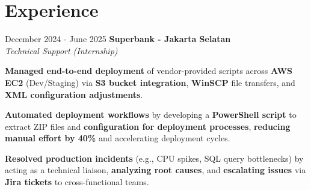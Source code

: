 \documentclass[../main.tex]{subfiles}
\begin{document}
\section{Experience}

\begin{twocolentry}{December 2024 - June 2025}
    \textbf{Superbank \color{Gray}- Jakarta Selatan}\\
    \textit{Technical Support (Internship)}
\end{twocolentry}

\vspace{0.10 cm}
\begin{onecolentry}
\begin{highlights}
    \item \textbf{Managed end-to-end deployment} of vendor-provided scripts across \textbf{AWS EC2} (Dev/Staging) via \textbf{S3 bucket integration}, \textbf{WinSCP} file transfers, and \textbf{XML configuration adjustments}.
    \item \textbf{Automated deployment workflows} by developing a \textbf{PowerShell script} to extract ZIP files and \textbf{configuration for deployment processes}, \textbf{reducing manual effort by 40\%} and accelerating deployment cycles.
    \item \textbf{Resolved production incidents} (e.g., CPU spikes, SQL query bottlenecks) by acting as a technical liaison, \textbf{analyzing root causes}, and \textbf{escalating issues} via \textbf{Jira tickets} to cross-functional teams.
\end{highlights}
\end{onecolentry}
\end{document}
